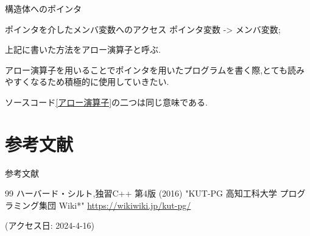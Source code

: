 \begin{frame}{構造体へのポインタ}

    

    \newpage

    \begin{block}{ポインタを介したメンバ変数へのアクセス}
    ポインタ変数 -> メンバ変数;

    上記に書いた方法をアロー演算子と呼ぶ.
\end{block}
アロー演算子を用いることでポインタを用いたプログラムを書く際,とても読みやすくなるため積極的に使用していきたい.



ソースコード\ref{アロー演算子}の二つは同じ意味である.
\end{frame}

\section{参考文献}
\begin{frame}{参考文献}
    \begin{thebibliography} {99}
    ハーバード・シルト,独習C++ 第4版 (2016)
    "KUT-PG 高知工科大学 プログラミング集団 Wiki*"
    \url{https://wikiwiki.jp/kut-pg/}
    
    (アクセス日: 2024-4-16)
    \end{thebibliography}
\end{frame}
